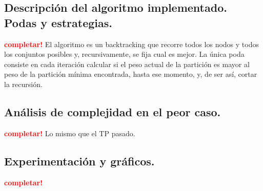 \subsection{Descripción del algoritmo implementado. Podas y estrategias.}
\vspace*{0.3cm}
\textcolor{red}{\textbf{completar!}}
El algoritmo es un backtracking que recorre todos los nodos y todos los conjuntos posibles y, recursivamente, se fija cual es mejor.
La única poda consiste en cada iteración calcular si el peso actual de la partición es mayor al peso de la partición mínima encontrada, hasta ese momento, y, de ser así, cortar la recursión.


\newpage
\subsection{Análisis de complejidad en el peor caso.}
\vspace*{0.3cm}
\textcolor{red}{\textbf{completar!}}
Lo mismo que el TP pasado.


\newpage
\subsection{Experimentación y gráficos.}
\vspace*{0.3cm}
\textcolor{red}{\textbf{completar!}}

